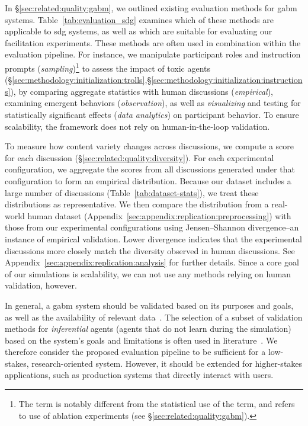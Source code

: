 In \S\ref{sec:related:quality:gabm}, we outlined existing evaluation methods for \ac{gabm} systems. Table~\ref{tab:evaluation_sdg} examines which of these methods are applicable to \ac{sdg} systems, as well as which are suitable for evaluating our facilitation experiments. These methods are often used in combination within the evaluation pipeline. For instance, we manipulate participant roles and instruction prompts (\emph{sampling})\footnote{The term is notably different from the statistical use of the term, and refers to use of ablation experiments (see \S\ref{sec:related:quality:gabm}).} to assess the impact of toxic agents (\S\ref{sec:methodology:initialization:trolls},\S\ref{sec:methodology:initialization:instructions}), by comparing aggregate statistics with human discussions (\emph{empirical}), examining emergent behaviors (\emph{observation}), as well as \emph{visualizing} and testing for statistically significant effects (\emph{data analytics}) on participant behavior. To ensure scalability, the framework does not rely on human-in-the-loop validation.

To measure how content variety changes across discussions, we compute a \diversity score for each discussion (\S\ref{sec:related:quality:diversity}). For each experimental configuration, we aggregate the \diversity scores from all discussions generated under that configuration to form an empirical distribution. Because our dataset includes a large number of discussions (Table~\ref{tab:dataset-stats}), we treat these distributions as representative. We then compare the distribution from a real-world human dataset (Appendix~\ref{sec:appendix:replication:preprocessing}) with those from our experimental configurations using Jensen–Shannon divergence--an instance of empirical validation. Lower divergence indicates that the experimental discussions more closely match the diversity observed in human discussions. See Appendix~\ref{sec:appendix:replication:analysis} for further details. Since a core goal of our simulations is scalability, we can not use any methods relying on human validation, however.

In general, a \ac{gabm} system should be validated based on its purposes and goals, as well as the availability of relevant data~\cite{collins2024,adornetto2025_gabms}. The selection of a subset of validation methods for \textit{inferential} agents (agents that do not learn during the simulation) based on the system's goals and limitations is often used in literature~\cite{adornetto2025_gabms}. We therefore consider the proposed evaluation pipeline to be sufficient for a low-stakes, research-oriented system. However, it should be extended for higher-stakes applications, such as production systems that directly interact with users.


